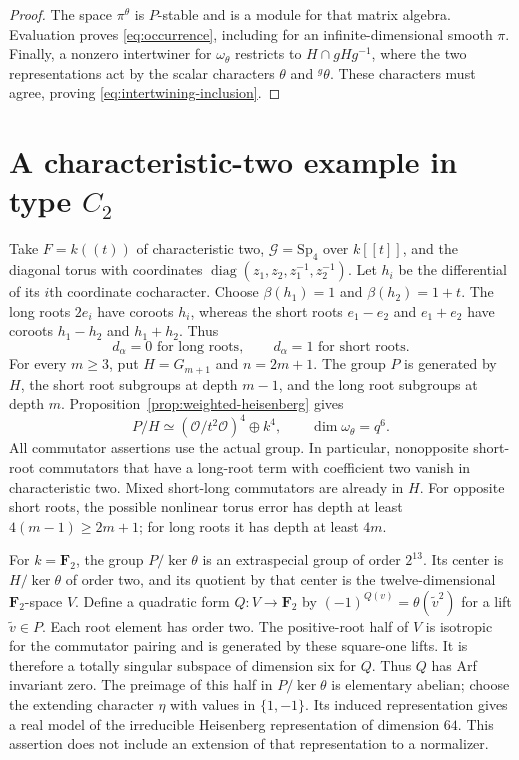 \documentclass[10pt]{amsart}
\newcommand{\Ocal}{\mathcal O}
\newcommand{\Gcal}{\mathcal G}
\begin{document}
\begin{proof}
The space $\pi^\theta$ is $P$-stable and is a module for that matrix algebra.
Evaluation proves \eqref{eq:occurrence}, including for an infinite-dimensional
smooth $\pi$. Finally, a nonzero intertwiner for $\omega_\theta$ restricts to
$H\cap gHg^{-1}$, where the two representations act by the scalar characters
$\theta$ and ${}^g\theta$. These characters must agree, proving
\eqref{eq:intertwining-inclusion}.
\end{proof}

\section{A characteristic-two example in type $C_2$}

Take $F=k((t))$ of characteristic two, $\Gcal=\mathrm{Sp}_4$ over $k[[t]]$, and
the diagonal torus with coordinates
$\operatorname{diag}(z_1,z_2,z_1^{-1},z_2^{-1})$.
Let $h_i$ be the differential of its $i$th coordinate cocharacter. Choose
$\beta(h_1)=1$ and $\beta(h_2)=1+t$. The long roots $2e_i$ have coroots $h_i$,
whereas the short roots $e_1-e_2$ and $e_1+e_2$ have coroots $h_1-h_2$ and
$h_1+h_2$. Thus
\[
 d_\alpha=0\text{ for long roots},\qquad
 d_\alpha=1\text{ for short roots}.
\]
For every $m\geq3$, put $H=G_{m+1}$ and $n=2m+1$. The group $P$ is generated
by $H$, the short root subgroups at depth $m-1$, and the long root subgroups
at depth $m$. Proposition~\ref{prop:weighted-heisenberg} gives
\[
 P/H\simeq(\Ocal/t^2\Ocal)^4\oplus k^4,
 \qquad \dim\omega_\theta=q^6.
\]
All commutator assertions use the actual group. In particular, nonopposite
short-root commutators that have a long-root term with coefficient two vanish
in characteristic two. Mixed short-long commutators are already in $H$.
For opposite short roots, the possible nonlinear torus error has depth at least
$4(m-1)\geq2m+1$; for long roots it has depth at least $4m$.

For $k=\mathbf F_2$, the group $P/\ker\theta$ is an extraspecial group of order
$2^{13}$. Its center is $H/\ker\theta$ of order two, and its quotient by that
center is the twelve-dimensional $\mathbf F_2$-space $V$. Define a quadratic
form $Q:V\to\mathbf F_2$ by
$(-1)^{Q(v)}=\theta(\widetilde v^2)$ for a lift $\widetilde v\in P$.
Each root element has order two. The positive-root half of $V$ is isotropic
for the commutator pairing and is generated by these square-one lifts.
It is therefore a totally singular subspace of dimension six for $Q$.
Thus $Q$ has Arf invariant zero. The preimage of this half in
$P/\ker\theta$ is elementary abelian; choose the extending character $\eta$
with values in $\{1,-1\}$. Its induced representation gives a real model of
the irreducible Heisenberg representation of dimension $64$. This assertion
does not include an extension of that representation to a normalizer.
\end{document}
